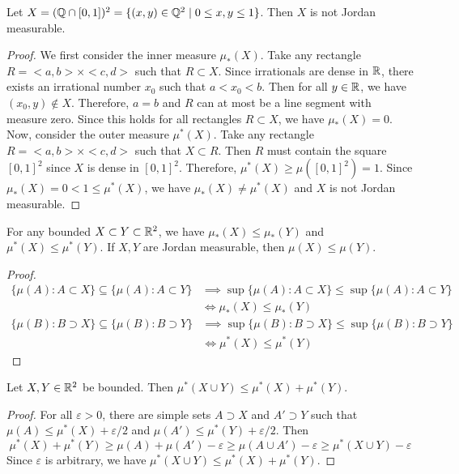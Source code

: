 \begin{example}
    Let $X=(\mathbb{Q}\cap [0,1])^2= \{(x,y)\in \mathbb{Q}^2 \mid 0\le x,y \le 1\}$. Then $X$ is not Jordan measurable.
\end{example}
\begin{proof}
    We first consider the inner measure $\mu_*(X)$. Take any rectangle $R = <a,b>\times<c,d>$ such that $R\subset X$. Since irrationals are dense in $\mathbb{R}$, there exists an irrational number $x_0$ such that $a < x_0 < b$. Then for all $y\in \mathbb{R}$, we have $(x_0,y)\notin X$. Therefore, $a=b$ and $R$ can at most be a line segment with measure zero. Since this holds for all rectangles $R\subset X$, we have $\mu_*(X) = 0$. Now, consider the outer measure $\mu^*(X)$. Take any rectangle $R=<a,b>\times<c,d>$ such that $X\subset R$. Then $R$ must contain the square $[0,1]^2$ since $X$ is dense in $[0,1]^2$. Therefore, $\mu^*(X) \ge \mu([0,1]^2) = 1$. Since $\mu_*(X) = 0 < 1 \le \mu^*(X)$, we have $\mu_*(X) \neq \mu^*(X)$ and $X$ is not Jordan measurable.
\end{proof}

\begin{proposition}
    For any bounded $X\subset Y \subset \mathbb{R}^2$, we have $\mu_*(X) \leq \mu_*(Y)$ and $\mu^*(X) \leq \mu^*(Y)$. If $X,Y$ are Jordan measurable, then $\mu(X) \leq \mu(Y)$.
\end{proposition}
\begin{proof}
    \begin{align*}
        \{\mu(A) : A \subset X \}\subseteq\{\mu(A) : A \subset Y \} &\implies \sup\{\mu(A) : A \subset X \}\le \sup\{\mu(A) : A \subset Y \} \\
        &\iff \mu_*(X) \le \mu_*(Y)
    \end{align*}
    \begin{align*}
        \{\mu(B) : B \supset X \}\subseteq\{\mu(B) : B \supset Y \} &\implies \sup\{\mu(B) : B \supset X \}\le \sup\{\mu(B) : B \supset Y \} \\
        &\iff \mu^*(X) \le \mu^*(Y)
    \end{align*}
\end{proof}

\begin{theorem}
    Let $X,Y\in \mathbb{R}^2$ be bounded. Then $\mu^*(X\cup Y) \le \mu^*(X) + \mu^*(Y)$.
\end{theorem}
\begin{proof}
    For all $\varepsilon>0$, there are simple sets $A\supset X$ and $A'\supset Y$ such that $\mu(A) \le \mu^*(X) + \varepsilon/2$ and $\mu(A') \le \mu^*(Y)+\varepsilon/2$. Then
    \[
        \mu^*(X) + \mu^*(Y) \ge \mu(A) + \mu(A') - \varepsilon \ge \mu (A\cup A') - \varepsilon \ge \mu^*(X\cup Y) - \varepsilon
    \]
    Since $\varepsilon$ is arbitrary, we have $\mu^*(X\cup Y) \le \mu^*(X) + \mu^*(Y)$.
\end{proof}

